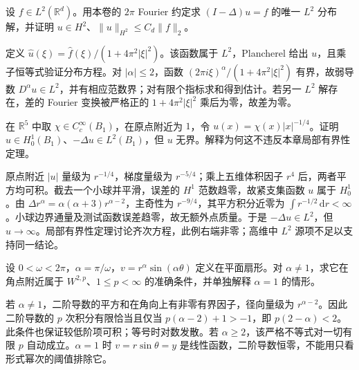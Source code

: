 \begin{exercise}\label{b2:ex:16-fourier-h2}
设 \(f\in L^2(\mathbb R^d)\)。用本卷的 \(2\pi\) Fourier 约定求 \((I-\Delta)u=f\) 的唯一 \(L^2\) 分布解，并证明 \(u\in H^2\)、\(\lVert u\rVert_{H^2}\le C_d\lVert f\rVert_2\)。
\end{exercise}
\begin{solution}
定义 \(\widehat u(\xi)=\widehat f(\xi)/(1+4\pi^2|\xi|^2)\)。该函数属于 \(L^2\)，Plancherel 给出 \(u\)，且乘子恒等式验证分布方程。对 \(|\alpha|\le2\)，函数 \((2\pi i\xi)^\alpha/(1+4\pi^2|\xi|^2)\) 有界，故弱导数 \(D^\alpha u\in L^2\)，并有相应范数界；对有限个指标求和得到估计。若另一 \(L^2\) 解存在，差的 Fourier 变换被严格正的 \(1+4\pi^2|\xi|^2\) 乘后为零，故差为零。
\end{solution}

\begin{exercise}\label{b2:ex:16-l2-unbounded}
在 \(\mathbb R^5\) 中取 \(\chi\in C_c^\infty(B_1)\)，在原点附近为 \(1\)，令 \(u(x)=\chi(x)|x|^{-1/4}\)。证明 \(u\in H_0^1(B_1)\)、\(-\Delta u\in L^2(B_1)\)，但 \(u\) 无界。解释为何这不违反本章局部有界性定理。
\end{exercise}
\begin{solution}
原点附近 \(|u|\) 量级为 \(r^{-1/4}\)，梯度量级为 \(r^{-5/4}\)；乘上五维体积因子 \(r^4\) 后，两者平方均可积。截去一个小球并平滑，误差的 \(H^1\) 范数趋零，故紧支集函数 \(u\) 属于 \(H_0^1\)。由 \(\Delta r^\alpha=\alpha(\alpha+3)r^{\alpha-2}\)，主奇性为 \(r^{-9/4}\)，其平方积分近零为 \(\int r^{-1/2}\,\mathrm dr<\infty\)。小球边界通量及测试函数误差趋零，故无额外点质量。于是 \(-\Delta u\in L^2\)，但 \(u\to\infty\)。局部有界性定理讨论齐次方程，此例右端非零；高维中 \(L^2\) 源项不足以支持同一结论。
\end{solution}

\begin{exercise}\label{b2:ex:16-corner-threshold}
设 \(0<\omega<2\pi\)，\(\alpha=\pi/\omega\)，\(v=r^\alpha\sin(\alpha\theta)\) 定义在平面扇形。对 \(\alpha\ne1\)，求它在角点附近属于 \(W^{2,p}\)、\(1\le p<\infty\) 的准确条件，并单独解释 \(\alpha=1\) 的情形。
\end{exercise}
\begin{solution}
若 \(\alpha\ne1\)，二阶导数的平方和在角向上有非零有界因子，径向量级为 \(r^{\alpha-2}\)。因此二阶导数的 \(p\) 次积分有限恰当且仅当 \(p(\alpha-2)+1>-1\)，即 \(p(2-\alpha)<2\)。此条件也保证较低阶项可积；等号时对数发散。若 \(\alpha\ge2\)，该严格不等式对一切有限 \(p\) 自动成立。\(\alpha=1\) 时 \(v=r\sin\theta=y\) 是线性函数，二阶导数恒零，不能用只看形式幂次的阈值排除它。
\end{solution}

